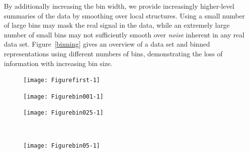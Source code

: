 \documentclass[11pt]{isuthesis}\usepackage[]{graphicx}\usepackage[]{color}
\newenvironment{knitrout}{}{} %
\begin{document}
By additionally increasing the bin width, we provide increasingly higher-level summaries of the data by smoothing over local structures. Using a small number of large bins may mask the real signal in the data, while an extremely large number of small bins may not sufficiently smooth over {\it noise} inherent in any real data set. Figure~\ref{binning} gives an overview of a data set and binned representations using different numbers of bins, demonstrating the loss of information with increasing bin size. 

\begin{figure}[hbtp]

\begin{minipage}{.35\linewidth}
\begin{knitrout}
\color{fgcolor}

{\centering \texttt{[image: Figurefirst-1]} 

}



\end{knitrout}
\end{minipage}
\hfil\begin{minipage}{.645\linewidth}
\begin{minipage}{.495\linewidth}
\begin{knitrout}
\color{fgcolor}

{\centering \texttt{[image: Figurebin001-1]} 

}



\end{knitrout}
\end{minipage}\hfil
\begin{minipage}{.495\linewidth}
\begin{knitrout}
\color{fgcolor}

{\centering \texttt{[image: Figurebin025-1]} 

}



\end{knitrout}
\end{minipage}\\
\hfil\begin{minipage}{.495\linewidth}
\begin{knitrout}
\color{fgcolor}

{\centering \texttt{[image: Figurebin05-1]} 

}
\end{knitrout}
\end{minipage}
\end{minipage}
\end{figure}
\end{document}
